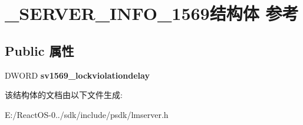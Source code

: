 \hypertarget{struct___s_e_r_v_e_r___i_n_f_o__1569}{}\section{\+\_\+\+S\+E\+R\+V\+E\+R\+\_\+\+I\+N\+F\+O\+\_\+1569结构体 参考}
\label{struct___s_e_r_v_e_r___i_n_f_o__1569}
\subsection*{Public 属性}
\begin{DoxyCompactItemize}
\item 
\mbox{\label{struct___s_e_r_v_e_r___i_n_f_o__1569_a93cf943f5e422a8160cf68e2b4c64c16}} 
D\+W\+O\+RD {\bfseries sv1569\+\_\+lockviolationdelay}
\end{DoxyCompactItemize}


该结构体的文档由以下文件生成\+:\begin{DoxyCompactItemize}
\item 
E\+:/\+React\+O\+S-\/0../sdk/include/psdk/lmserver.\+h\end{DoxyCompactItemize}
